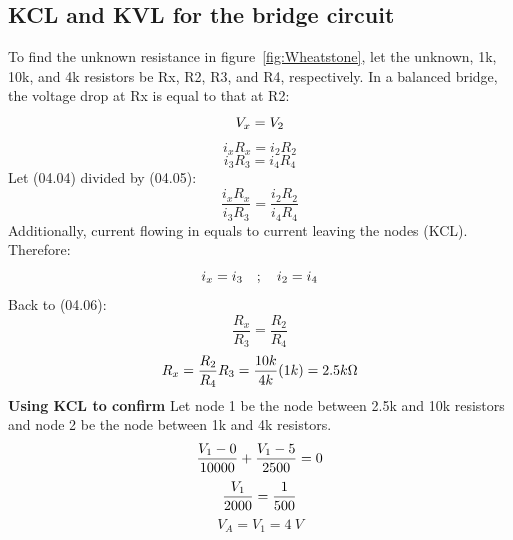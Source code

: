 \documentclass[12pt]{article}
\begin{document}
\subsection{KCL and KVL for the bridge circuit}
To find the unknown resistance in figure~\ref{fig:Wheatstone}, let the unknown, 1k, 10k, and 4k resistors be Rx, R2, R3, and R4, respectively. In a balanced bridge, the voltage drop at Rx is equal to that at R2: 
\begin{equation}
    V_x = V_2 
    \notag
\end{equation}
\begin{equation}
    i_x R_x = i_2 R_2 
    \tag{04.04}
\end{equation}
\begin{equation}
    i_3 R_3 = i_4 R_4 
    \tag{04.05}
\end{equation}
Let (04.04) divided by (04.05): 
\begin{equation}
    \frac{i_x R_x}{i_3 R_3} = \frac{i_2 R_2 }{i_4 R_4 }
    \tag{04.06}
\end{equation}
\noindent Additionally, current flowing in equals to current leaving the nodes (KCL). Therefore: 
\begin{equation}
    i_x = i_3 \quad ; \quad  i_2 = i_4
    \notag
\end{equation}
Back to (04.06): 
\begin{equation}
    \frac{R_x}{R_3} = \frac{R_2 }{R_4 }
    \tag{04.07}
    \label{balancedCondition}
\end{equation}
\begin{equation}
    R_x = \frac{R_2 }{R_4 }R_3 = \frac{10k}{4k}(1k) = 2.5k \SI{}{\ohm} 
    \notag
\end{equation}
\textbf{Using KCL to confirm}
\addlinespace
Let node 1 be the node between 2.5k and 10k resistors and node 2 be the node between 1k and 4k resistors.
\begin{equation}
    \frac{V_1-0}{10000} + \frac{V_1-5}{2500} = 0 
    \notag
\end{equation}
\begin{equation}
    \frac{V_1}{2000} = \frac{1}{500}
    \notag
\end{equation}
\begin{equation}
 V_A =   V_1 = \SI{4}{V}
    \tag{04.08}
    \label{Va}
\end{equation}
\end{document}
